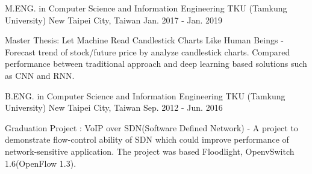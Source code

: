 

\begin{cventries}

    \cventry
        {M.ENG. in Computer Science and Information Engineering}
        {TKU (Tamkung University)}
        {New Taipei City, Taiwan}
        {Jan. 2017 - Jan. 2019}
        {
            \begin{cvitems}
                \item 
                    {
                        Master Thesis: Let Machine Read Candlestick Charts Like Human Beings - Forecast trend of stock/future price by analyze candlestick charts. Compared performance between traditional approach and deep learning based solutions such as CNN and RNN.
                    }
            \end{cvitems}
        }

    \cventry
        {B.ENG. in Computer Science and Information Engineering}
        {TKU (Tamkung University)}
        {New Taipei City, Taiwan}
        {Sep. 2012 - Jun. 2016}
        {
            \begin{cvitems}
                \item 
                    {
                        Graduation Project : VoIP over SDN(Software Defined Network) - A project to demonstrate flow-control ability of SDN which could improve performance of network-sensitive application. The project was based Floodlight, OpenvSwitch 1.6(OpenFlow 1.3).
                    }
            \end{cvitems}
        }
    


\end{cventries}
